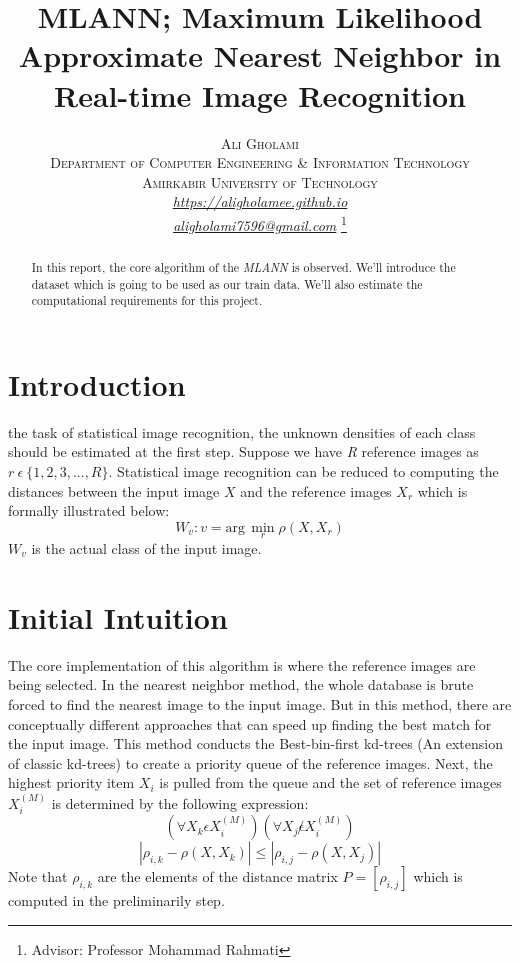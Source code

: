 \documentclass[journal, a4paper]{IEEEtran}
\begin{document}
	\title{MLANN; Maximum Likelihood Approximate Nearest Neighbor in Real-time Image Recognition}
	\author{\textsc{Ali Gholami\\ Department of Computer Engineering \& Information Technology\\ Amirkabir University of Technology}\\\textit{\url{https://aligholamee.github.io}\\\url{aligholami7596@gmail.com}}
	\thanks{Advisor: Professor Mohammad Rahmati}}
	\maketitle

\begin{abstract}
	In this report, the core algorithm of the \textit{MLANN} is observed. We'll introduce the dataset which is going to be used as our train data. We'll also estimate the computational requirements for this project.
\end{abstract}

\section{Introduction}
	 the task of statistical image recognition, the unknown densities of each class should be estimated at the first step. Suppose we have \textit{R} reference images as $r\ \epsilon\ \{1, 2, 3, ..., R\}$. Statistical image recognition can be reduced to computing the distances between the input image $X$ and the reference images $X_r$ which is formally illustrated below:
	$$
		W_v: v = \text{arg}\,\min\limits_{r} \rho(X, X_r)
	$$
	$W_v$ is the actual class of the input image.
	
\section{Initial Intuition}
The core implementation of this algorithm is where the reference images are being selected. In the nearest neighbor method, the whole database is brute forced to find the nearest image to the input image. But in this method, there are conceptually different approaches that can speed up finding the best match for the input image. This method conducts the Best-bin-first kd-trees (An extension of classic kd-trees) to create a priority queue of the reference images. Next, the highest priority item $X_i$ is pulled from the queue and the set of reference images $X_i^{(M)}$ is determined by the following expression:
$$
	(\forall X_k \epsilon X_i^{(M)})(\forall X_j \not\epsilon X_i^{(M)})
$$
$$
	|\rho_{i, k} - \rho(X, X_k)| \leq |\rho_{i, j} - \rho(X, X_j)|
$$
Note that $\rho_{i, k}$ are the elements of the distance matrix $P = [\rho_{i, j}]$ which is computed in the preliminarily step.
\end{document}
